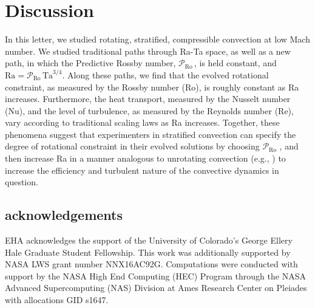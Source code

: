 \documentclass[twocolumn, amsmath, amsfonts, amssymb]{aastex62}
\newcommand{\pro}{\ensuremath{\mathcal{P}_{\text{Ro}}\,}}
\begin{document}
\section{Discussion}
\label{sec:discussion}
In this letter, we studied rotating, stratified, compressible convection at low Mach 
number. We studied traditional paths through Ra-Ta space, as well as a new path,
in which the Predictive Rossby number, \pro, is held constant, and
$\text{Ra} = \pro \text{Ta}^{3/4}$. Along these paths, we find that the evolved
rotational constraint, as measured by the Rossby number (Ro), is roughly constant as
Ra increases. Furthermore, the heat transport, measured by the Nusselt number (Nu), and the
level of turbulence, as measured by the Reynolds number (Re), vary according to traditional 
scaling laws as Ra increases. Together, these phenomena suggest that experimenters in
stratified convection can specify the degree of rotational constraint in their evolved
solutions by choosing \pro$\,$, and then increase Ra in a manner analogous to 
unrotating convection (e.g., \AB) to increase the efficiency and turbulent nature of the
convective dynamics in question.







\subsection{acknowledgements}
EHA acknowledges the support of the University of Colorado's George 
Ellery Hale Graduate Student Fellowship.
This work was additionally supported by  NASA LWS grant number NNX16AC92G.  
Computations were conducted 
with support by the NASA High End Computing (HEC) Program through the NASA 
Advanced Supercomputing (NAS) Division at Ames Research Center on Pleiades
with allocations GID s1647.


\end{document}
